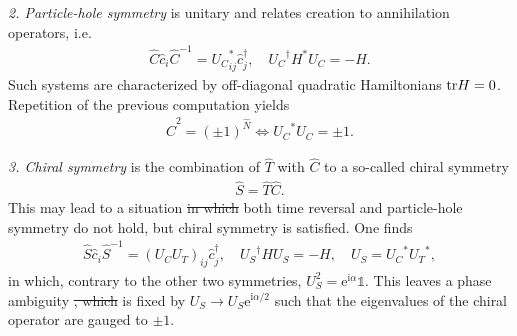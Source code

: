 \documentclass{svmono}
\def\ri{\mathrm i}
\def\re{\mathrm e}
\def\tr{{\rm tr}}
\providecommand{\DIFaddtex}[1]{{\protect\color{blue}\uwave{#1}}} %
\providecommand{\DIFdeltex}[1]{{\protect\color{red}\sout{#1}}}                      %
\providecommand{\DIFaddbegin}{} %
\providecommand{\DIFaddend}{} %
\providecommand{\DIFdelbegin}{} %
\providecommand{\DIFdelend}{} %
\providecommand{\DIFadd}[1]{\texorpdfstring{\DIFaddtex{#1}}{#1}} %
\providecommand{\DIFdel}[1]{\texorpdfstring{\DIFdeltex{#1}}{}} %
\newcommand{\DIFscaledelfig}{0.5}
\newlength{\DIFdelgraphicswidth} %
\newlength{\DIFdelgraphicsheight} %
\newcommand{\DIFaddincludegraphics}[2][]{{\color{blue}\fbox{\DIFOincludegraphics[#1]{#2}}}} %
\newcommand{\DIFdelincludegraphics}[2][]{%
\sbox{\DIFdelgraphicsbox}{\DIFOincludegraphics[#1]{#2}}%
\settoboxwidth{\DIFdelgraphicswidth}{\DIFdelgraphicsbox} %
\settoboxtotalheight{\DIFdelgraphicsheight}{\DIFdelgraphicsbox} %
\scalebox{\DIFscaledelfig}{%
\parbox[b]{\DIFdelgraphicswidth}{\usebox{\DIFdelgraphicsbox}\\[-\baselineskip] \rule{\DIFdelgraphicswidth}{0em}}\llap{\resizebox{\DIFdelgraphicswidth}{\DIFdelgraphicsheight}{%
\setlength{\unitlength}{\DIFdelgraphicswidth}%
\begin{picture}(1,1)%
\thicklines\linethickness{2pt} %
{\color[rgb]{1,0,0}\put(0,0){\framebox(1,1){}}}%
{\color[rgb]{1,0,0}\put(0,0){\line( 1,1){1}}}%
{\color[rgb]{1,0,0}\put(0,1){\line(1,-1){1}}}%
\end{picture}%
}\hspace*{3pt}}} %
} %
\DeclareRobustCommand{\DIFaddbegin}{\DIFOaddbegin \let\includegraphics\DIFaddincludegraphics} %
\DeclareRobustCommand{\DIFaddend}{\DIFOaddend \let\includegraphics\DIFOincludegraphics} %
\DeclareRobustCommand{\DIFdelbegin}{\DIFOdelbegin \let\includegraphics\DIFdelincludegraphics} %
\DeclareRobustCommand{\DIFdelend}{\DIFOaddend \let\includegraphics\DIFOincludegraphics} %
\begin{document}
{\it 2. Particle-hole symmetry} is unitary and relates creation to annihilation operators, i.e.
\begin{align}
    \hat C \hat c_i \hat C^{-1} = {U_C}^*_{ij} \hat c^\dag_j
    ,\quad
    {U_C}^\dag H^* {U_C} = -H
    .
\end{align}
Such systems are characterized by off-diagonal quadratic Hamiltonians $\tr H=0$.
Repetition of the previous computation yields
\begin{align}
    \hat C^2 = (\pm1)^{\hat N}
    \Leftrightarrow
    {U_C}^* {U_C} = \pm 1.
\end{align}

{\it 3. Chiral symmetry} is the combination of $\hat T$ with $\hat C$ to a so-called chiral symmetry
\begin{align}
    \hat S = \hat T \hat C.
\end{align}
This may lead to a situation \DIFdelbegin \DIFdel{in which }\DIFdelend \DIFaddbegin \DIFadd{where }\DIFaddend both time reversal and particle-hole symmetry do not hold, but chiral symmetry is satisfied.
One finds
\DIFdelbegin %
\DIFdelend \DIFaddbegin \begin{align}
    \hat S \hat c_i \hat S^{-1} = (U_CU_T)_{ij}\hat c^\dag_j
    ,\quad
    {U_S}^\dag H {U_S} = -H
    ,\quad
    {U_S} = {U_C}^* {U_T}^*
    ,
\end{align}\DIFaddend 
in which, contrary to the other two symmetries, $U_S^2=\re^{\ri\alpha}\mathbb1$.
This leaves a phase ambiguity \DIFdelbegin \DIFdel{, which }\DIFdelend \DIFaddbegin \DIFadd{that }\DIFaddend is fixed by $U_S\rightarrow U_S\re^{\ri\alpha/2}$ such that the eigenvalues of the chiral operator are gauged to $\pm1$.
\end{document}
